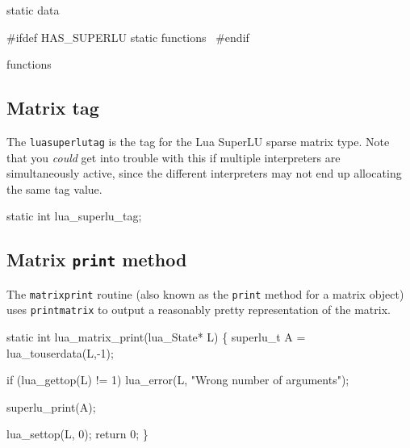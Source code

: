 \LA{}static data~{\nwtagstyle{}}\RA{}

#ifdef HAS_SUPERLU
\LA{}static functions~{\nwtagstyle{}}\RA{}
#endif

\LA{}functions~{\nwtagstyle{}}\RA{}
\nwendcode{}\nwdocspar


\subsection{Matrix tag}

The {\tt{}lua{}superlu{}tag} is the tag for the Lua SuperLU sparse matrix type.
Note that you \emph{could} get into trouble
with this if multiple interpreters are simultaneously active,
since the different interpreters may not end up allocating the same
tag value.

\nwenddocs{}\endmoddef
static int lua_superlu_tag;

\nwendcode{}\nwdocspar


\subsection{Matrix {\tt{}print} method}

The {\tt{}matrix{}print} routine (also known as the {\tt{}print} method
for a matrix object) uses {\tt{}print{}matrix} to output a reasonably
pretty representation of the matrix.

\nwenddocs{}\endmoddef
static int lua_matrix_print(lua_State* L)
\{
    superlu_t A = lua_touserdata(L,-1);

    if (lua_gettop(L) != 1)
        lua_error(L, "Wrong number of arguments");

    superlu_print(A);

    lua_settop(L, 0);
    return 0;
\}

\nwendcode{}\nwdocspar


